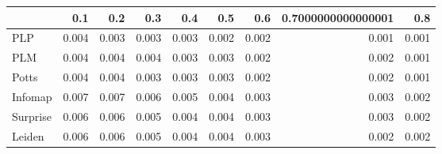 \begin{tabular}{lrrrrrrrr}
\toprule
{} &   0.1 &   0.2 &   0.3 &   0.4 &   0.5 &   0.6 & 0.7000000000000001 &   0.8 \\
\midrule
PLP      & 0.004 & 0.003 & 0.003 & 0.003 & 0.002 & 0.002 &              0.001 & 0.001 \\
PLM      & 0.004 & 0.004 & 0.004 & 0.003 & 0.003 & 0.002 &              0.002 & 0.001 \\
Potts    & 0.004 & 0.004 & 0.003 & 0.003 & 0.003 & 0.002 &              0.002 & 0.001 \\
Infomap  & 0.007 & 0.007 & 0.006 & 0.005 & 0.004 & 0.003 &              0.003 & 0.002 \\
Surprise & 0.006 & 0.006 & 0.005 & 0.004 & 0.004 & 0.003 &              0.003 & 0.002 \\
Leiden   & 0.006 & 0.006 & 0.005 & 0.004 & 0.004 & 0.003 &              0.002 & 0.002 \\
\bottomrule
\end{tabular}
